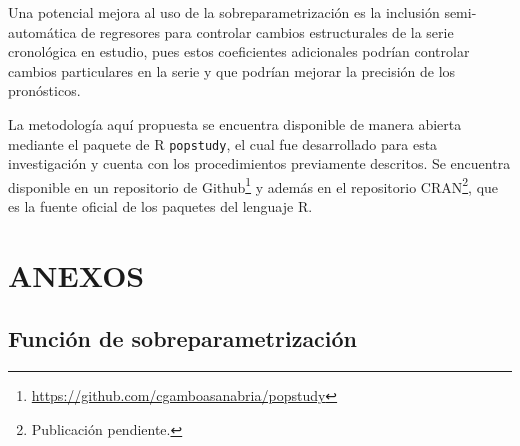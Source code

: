 \documentclass[
]{article}
\begin{document}
Una potencial mejora al uso de la sobreparametrización es la inclusión
semi-automática de regresores para controlar cambios estructurales de la
serie cronológica en estudio, pues estos coeficientes adicionales
podrían controlar cambios particulares en la serie y que podrían mejorar
la precisión de los pronósticos.

La metodología aquí propuesta se encuentra disponible de manera abierta
mediante el paquete de R \texttt{popstudy}, el cual fue desarrollado
para esta investigación y cuenta con los procedimientos previamente
descritos. Se encuentra disponible en un repositorio de
Github\footnote{\url{https://github.com/cgamboasanabria/popstudy}} y
además en el repositorio CRAN\footnote{Publicación pendiente.}, que es
la fuente oficial de los paquetes del lenguaje R.

\newpage

\section{ANEXOS}

\subsection{Función de sobreparametrización}

\label{funcion_op_arima}
\end{document}
